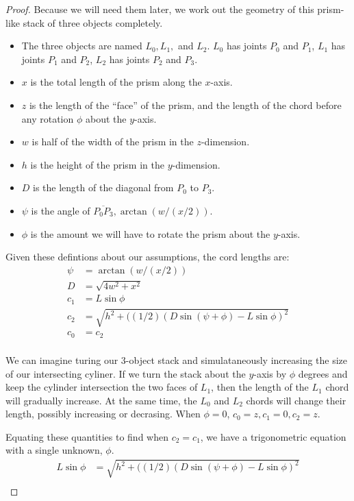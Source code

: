 \documentclass[11pt]{article}
\begin{document}
\begin{proof}
  Because we will need them later, we work out the geometry of this prism-like stack of three
  objects completely.
  \begin{itemize}
  \item The three objects are named $L_0,L_1,$ and $L_2$.
    $L_0$ has joints $P_0$ and $P_1$,
    $L_1$ has joints $P_1$ and $P_2$,
    $L_2$ has joints $P_2$ and $P_3$.
  \item  $x$ is the total length of the prism along the $x$-axis.
  \item $z$ is the length of the ``face'' of the prism, and the length
    of the chord before any rotation $\phi$ about the $y$-axis.
  \item $w$ is half of the width of the prism in the $z$-dimension.
  \item $h$ is the height of the prism in the $y$-dimension.
  \item $D$ is the length of the diagonal from $P_0$ to $P_3$.
  \item $\psi$ is the angle of $\overline{P_0P_3}, \arctan{(w/(x/2))}$.
    \item $\phi$ is the amount we will have to rotate the prism about the $y$-axis.
    \end{itemize}
Given these defintions about our assumptions, the cord lengths are:
\begin{align*}
  \psi &= \arctan{(w/(x/2))} \\
D &= \sqrt{4w^2+x^2} \\
c_1 &= L \sin{\phi} \\
c_2 &= \sqrt{h^2 + ((1/2)(D\sin{(\psi+\phi)}-L\sin{\phi})^2}  \\
c_0 &= c_2 \\
  \end{align*}
  

  We can imagine turing our 3-object stack and simulataneously increasing the size of our intersecting
  cyliner. If we turn the stack about the $y$-axis by $\phi$ degrees and keep the cylinder intersection
  the two faces of $L_1$, then the length of the $L_1$ chord will gradually increase. At the same time,
  the $L_0$ and $L_2$ chords will change their length, possibly increasing or decrasing.
  When $\phi = 0$, $c_0 = z, c_1 = 0, c_2 = z$.

  Equating these quantities to find when $c_2 = c_1$, we have a trigonometric equation with
  a single unknown, $\phi$.
    \begin{align*}
      L \sin{\phi} &= \sqrt{h^2 + ((1/2)(D\sin{(\psi+\phi)}-L\sin{\phi})^2} \\
    \end{align*}


\end{proof}
\end{document}
